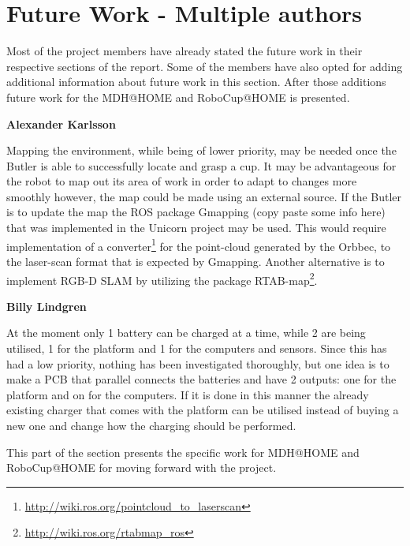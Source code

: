\section{Future Work - Multiple authors}
Most of the project members have already stated the future work in their respective sections of the report. Some of the members have also opted for adding additional information about future work in this section. After those additions future work for the MDH@HOME and RoboCup@HOME is presented.



\vspace{0.5cm}
\noindent\textbf{Alexander Karlsson}
    \begin{displayquote}
        Mapping the environment, while being of lower priority, may be needed once the Butler is able to successfully locate and grasp a cup. It may be advantageous for the robot to map out its area of work in order to adapt to changes more smoothly however, the map could be made using an external source. If the Butler is to update the map the ROS package Gmapping (copy paste some info here) that was implemented in the Unicorn project may be used. This would require implementation of a converter\footnote{\url{http://wiki.ros.org/pointcloud_to_laserscan}} for the point-cloud generated by the Orbbec, to the laser-scan format that is expected by Gmapping. Another alternative is to implement RGB-D SLAM by utilizing the package RTAB-map\footnote{\url{http://wiki.ros.org/rtabmap_ros}}.
    \end{displayquote}
\noindent\textbf{Billy Lindgren}
    \begin{displayquote}
        At the moment only 1 battery can be charged at a time, while 2 are being utilised, 1 for the platform and 1 for the computers and sensors. Since this has had a low priority, nothing has been investigated thoroughly, but one idea is to make a PCB that parallel connects the batteries and have 2 outputs: one for the platform and on for the computers. If it is done in this manner the already existing charger that comes with the platform can be utilised instead of buying a new one and change how the charging should be performed. 
    \end{displayquote}

\vspace{0.4cm}
This part of the section presents the specific work for MDH@HOME and RoboCup@HOME for moving forward with the project. \\
    
